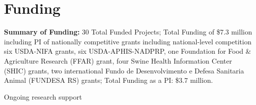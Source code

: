 \documentclass[11pt]{article}
\begin{document}
\section{Funding}

\textbf{Summary of Funding:} 30 Total Funded Projects; Total Funding of \$7.3 million including PI of
nationally competitive grants including national-level competition six USDA-NIFA grants, six USDA-APHIS-NADPRP, one Foundation for Food & Agriculture Research (FFAR) grant, four Swine Health Information Center (SHIC) grants, two international Fundo de Desenvolvimento e Defesa Sanitaria Animal (FUNDESA RS) grants; Total Funding as a PI: \$3.7 million.

\vspace{0.5cm}

Ongoing research support
\end{document}
